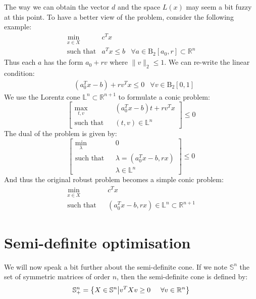 The way we can obtain the vector $d$ and the space $L(x)$ may seem a bit fuzzy at this point. To have a better view of the problem, consider the following example:
\begin{eqnarray*}
\min_{x\in X} & c^Tx\\
\text{such that} &  a^Tx \leq b & \forall a\in \mathrm{B}_2[a_0,r] \subset \mathbb{R}^n
\end{eqnarray*}
Thus each $a$ has the form $a_0 + rv$ where $\|v\|_2 \leq 1$. We can re-write the linear condition:
\begin{eqnarray*}
& (a_0^Tx - b) + rv^Tx \leq 0 & \forall v\in \mathrm{B}_2[0,1] 
\end{eqnarray*}
We use the Lorentz cone $\mathbb{L}^n \subset \mathbb{R}^{n+1}$ to formulate a conic problem:
\begin{equation*}
\left[ \begin{array}{rcl}
\max\limits_{t,v} & & (a_0^Tx - b)t + rv^Tx \\
\text{such that}& &  (t,v)\in \mathbb{L}^n 
\end{array}
\right] \leq 0
\end{equation*}
The dual of the problem is given by:
\begin{equation*}
\left[ \begin{array}{rcl} 
\min\limits_{\lambda} & & 0 \\
\text{such that} & & \lambda = (a_0^Tx - b,rx)\\
& &  \lambda\in \mathbb{L}^n 
\end{array}
 \right] \leq 0
\end{equation*}
And thus the original robust problem becomes a simple conic problem:
\begin{eqnarray*}
\min_{x\in X} & & c^Tx \\
\text{such that} & &  (a_0^Tx - b,rx) \in \mathbb{L}^n \subset \mathbb{R}^{n+1}
\end{eqnarray*}


\section{Semi-definite optimisation}

We will now speak a bit further about the semi-definite cone. If we note $\mathbb{S}^n$ the set of symmetric matrices of order $n$, then the semi-definite cone is defined by:
\begin{equation*}
\mathbb{S}^n_+ = \left\lbrace X \in \mathbb{S}^n  \big|  v^TXv \geq 0 \hspace{5mm} \forall v\in \mathbb{R}^n \right\rbrace
\end{equation*}

